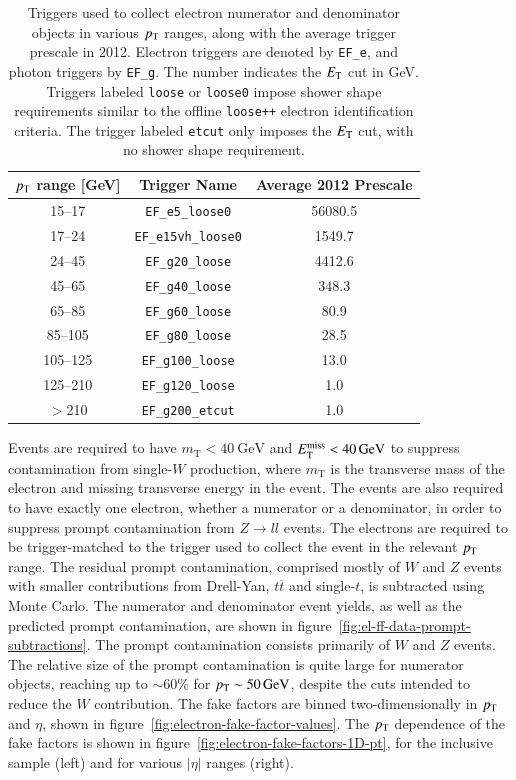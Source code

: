 \begin{table}[h]
  \centering
  \begin{tabular}{ccc}
  \hline
	$p_{\text{T}}$ range [GeV] & Trigger Name & Average 2012 Prescale \\
	\hline
	15--17 & 	\texttt{EF\_e5\_loose0}	& 56080.5\\
	17--24 & 	\texttt{EF\_e15vh\_loose0} 	& 1549.7\\
	24--45 & 	\texttt{EF\_g20\_loose}	& 4412.6\\
	45--65 & 	\texttt{EF\_g40\_loose}	& 348.3\\
	65--85 & 	\texttt{EF\_g60\_loose}	& 80.9\\
	85--105 & 	\texttt{EF\_g80\_loose}	& 28.5\\
	105--125 & 	\texttt{EF\_g100\_loose}	& 13.0\\
	125--210 & 	\texttt{EF\_g120\_loose}	& 1.0\\
	$>$210 & 	\texttt{EF\_g200\_etcut}	& 1.0\\ \hline
  \end{tabular}
  \caption{Triggers used to collect electron numerator and denominator objects in various $p_{\text{T}}$ ranges, along with the average trigger prescale in 2012. Electron triggers are denoted by \texttt{EF\_e}, and photon triggers by \texttt{EF\_g}. The number indicates the $E_{\mathrm{T}}$ cut in GeV. Triggers labeled \texttt{loose} or \texttt{loose0} impose shower shape requirements similar to the offline \texttt{loose++} electron identification criteria. The trigger labeled \texttt{etcut} only imposes the $E_{\mathrm{T}}$ cut, with no shower shape requirement.}
  \label{table:electron-fake-factor-triggers}
\end{table}

Events are required to have $m_{\mathrm{T}}<\SI{40}{\giga\electronvolt}$ and $E_{\text{T}}^{\text{miss}}<\SI{40}{\giga\electronvolt}$ to suppress contamination from single-$W$ production, where $m_{\mathrm{T}}$ is the transverse mass of the electron and missing transverse energy in the event. The events are also required to have exactly one electron, whether a numerator or a denominator, in order to suppress prompt contamination from $Z\rightarrow ll$ events. The electrons are required to be trigger-matched to the trigger used to collect the event in the relevant $p_{\text{T}}$ range. The residual prompt contamination, comprised mostly of $W$ and $Z$ events with smaller contributions from Drell-Yan, $t\overline{t}$ and single-$t$, is subtracted using Monte Carlo. The numerator and denominator event yields, as well as the predicted prompt contamination, are shown in figure~\ref{fig:el-ff-data-prompt-subtractions}. The prompt contamination consists primarily of $W$ and $Z$ events. The relative size of the prompt contamination is quite large for numerator objects, reaching up to $\sim60\%$ for $p_{\text{T}}\sim \SI{50}{\giga\electronvolt}$, despite the cuts intended to reduce the $W$ contribution. The fake factors are binned two-dimensionally in $p_{\text{T}}$ and $\eta$, shown in figure~\ref{fig:electron-fake-factor-values}. The $p_{\text{T}}$ dependence of the fake factors is shown in figure~\ref{fig:electron-fake-factors-1D-pt}, for the inclusive sample (left) and for various $|\eta|$ ranges (right).

